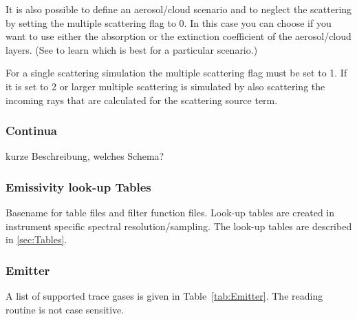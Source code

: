 It is also possible to define an aerosol/cloud scenario and to neglect the scattering by setting the multiple scattering flag to 0. In this case you can choose if you want to use either the absorption or the extinction coefficient of the aerosol/cloud layers. (See \citet{Hoepfner2005} to learn which is best for a particular scenario.)

For a single scattering simulation the multiple scattering flag must be set to 1. If it is set to 2 or larger multiple scattering is simulated by also scattering the incoming rays that are calculated for the scattering source term.

\subsubsection{Continua}
\todo kurze Beschreibung, welches Schema?

\subsubsection{Emissivity look-up Tables}
Basename for table files and filter function files. Look-up tables are created in instrument specific spectral resolution/sampling. The look-up tables are described in \ref{sec:Tables}.

\subsubsection{Emitter}
\label{sec:Emitter}
A list of supported trace gases is given in Table~\ref{tab:Emitter}. The reading routine is not case sensitive.

